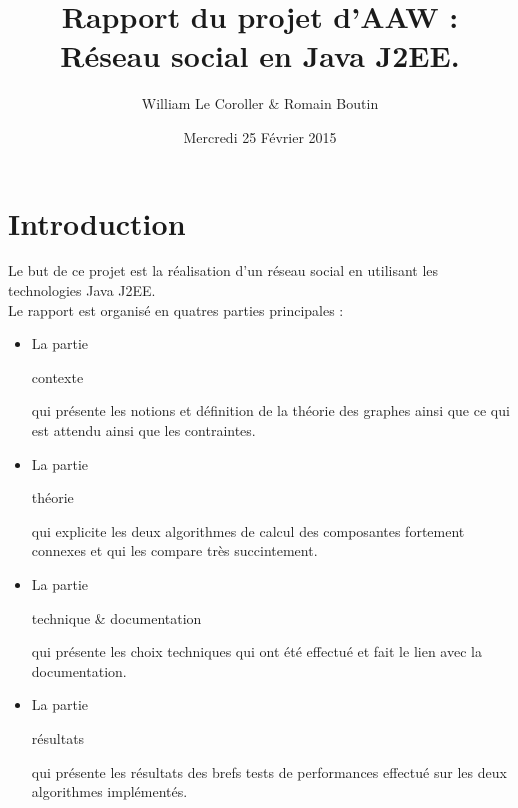 \documentclass[12pt,a4paper,titlepage]{article}
\title{Rapport du projet d'AAW :\\ 
Réseau social en Java J2EE.}
\author{William Le Coroller \& Romain Boutin}
\date{Mercredi 25 Février 2015}
\begin{document}






\thispagestyle{empty}

\maketitle

\clearpage{\pagestyle{empty}}






\clearpage{\pagestyle{empty}}

\tableofcontents
\clearpage{\pagestyle{empty}}







\clearpage{\pagestyle{empty}}



\section{Introduction}

Le but de ce projet est la réalisation d'un réseau social en utilisant les technologies
Java J2EE.\\

Le rapport est organisé en quatres parties principales :
\begin{itemize}
\item La partie \begin{bf}contexte\end{bf} qui présente les notions et définition
de la théorie des graphes ainsi que ce qui est attendu ainsi que les contraintes.
\item La partie \begin{bf}théorie\end{bf} qui explicite les deux algorithmes de 
calcul des composantes fortement connexes et qui les compare très succintement.
\item La partie \begin{bf}technique \& documentation\end{bf} qui présente 
les choix techniques qui ont été effectué et fait le lien avec la documentation.
\item La partie \begin{bf}résultats\end{bf} qui présente 
les résultats des brefs tests de performances effectué sur les deux algorithmes
implémentés.
\end{itemize}
\end{document}
